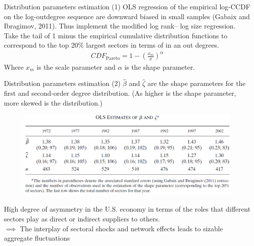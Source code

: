 \documentclass[dvipsnames]{beamer}
\begin{document}
\begin{frame}{Distribution parameters estimation (1)}
    \justifying
    OLS regression of the empirical log-CCDF
    on the log-outdegree sequence are downward biased in small samples (Gabaix and Ibragimov, 2011).
    Thus implement the modified log rank–
    log size regression. Take 
    the tail of  1 minus the empirical
    cumulative distribution functions to correspond to the top 20\%
    largest sectors in terms of in an out degrees.
    \begin{align*}
        CDF_{\text{Pareto}}=1-\left(\frac{x_m}{x}\right)^\alpha
    \end{align*}
    Where $x_m$ is the scale parameter and $\alpha$ is the shape parameter.
\end{frame}
\begin{frame}{Distribution parameters estimation (2)}
    \justifying
    $\hat{\beta}$ and $\hat{\zeta}$ are the shape parameters for the first and 
    second-order degree distribution. (As higher is the shape parameter, more skewed is the distribution.)
    \begin{figure}[H]
        \includegraphics[scale=0.6]{7}
        \centering
\end{figure}  

High degree of asymmetry in the
U.S. economy in terms of the roles that different sectors play as direct or indirect
suppliers to others.\\
$\implies$ The interplay of
sectoral shocks and network effects leads to sizable aggregate fluctuations

\end{frame}
\end{document}
